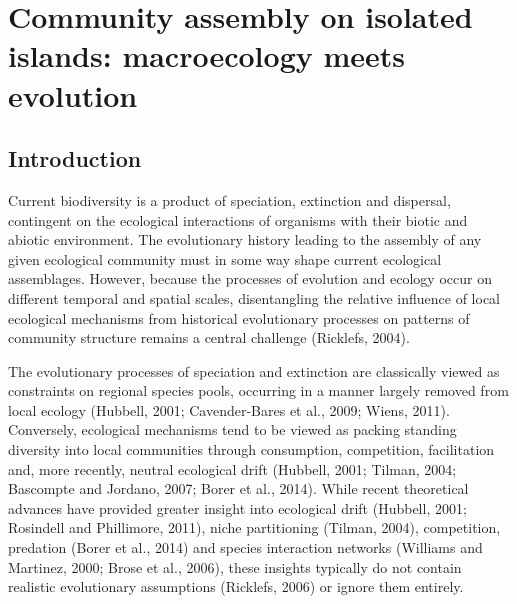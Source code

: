 \chapter{Community assembly on isolated islands: macroecology meets
evolution}

\section{Introduction}

Current biodiversity is a product of speciation, extinction and
dispersal, contingent on the ecological interactions of organisms with
their biotic and abiotic environment. The evolutionary history leading
to the assembly of any given ecological community must in some way
shape current ecological assemblages. However, because the processes
of evolution and ecology occur on different temporal and spatial
scales, disentangling the relative influence of local ecological
mechanisms from historical evolutionary processes on patterns of
community structure remains a central challenge (Ricklefs, 2004).

The evolutionary processes of speciation and extinction are
classically viewed as constraints on regional species pools, occurring
in a manner largely removed from local ecology (Hubbell, 2001;
Cavender-Bares et al., 2009; Wiens, 2011). Conversely, ecological
mechanisms tend to be viewed as packing standing diversity into local
communities through consumption, competition, facilitation and, more
recently, neutral ecological drift (Hubbell, 2001; Tilman, 2004;
Bascompte and Jordano, 2007; Borer et al., 2014). While recent
theoretical advances have provided greater insight into ecological
drift (Hubbell, 2001; Rosindell and Phillimore, 2011), niche
partitioning (Tilman, 2004), competition, predation (Borer et al.,
2014) and species interaction networks (Williams and Martinez, 2000;
Brose et al., 2006), these insights typically do not contain realistic
evolutionary assumptions (Ricklefs, 2006) or ignore them entirely.


